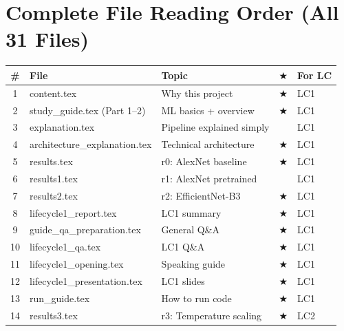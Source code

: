 \documentclass[12pt,a4paper]{article}
\begin{document}
\vspace{0.5cm}
\noindent{}

\section*{Complete File Reading Order (All 31 Files)}

\begin{center}
\renewcommand{\arraystretch}{1.15}
\footnotesize
\begin{tabular}{cllcl}
    \toprule
    \textbf{\#} & \textbf{File} & \textbf{Topic} & $\bigstar$ & \textbf{For LC} \\
    \midrule
    1 & content.tex & Why this project & $\bigstar$ & LC1 \\
    2 & study\_guide.tex (Part 1--2) & ML basics + overview & $\bigstar$ & LC1 \\
    3 & explanation.tex & Pipeline explained simply & & LC1 \\
    4 & architecture\_explanation.tex & Technical architecture & $\bigstar$ & LC1 \\
    5 & results.tex & r0: AlexNet baseline & $\bigstar$ & LC1 \\
    6 & results1.tex & r1: AlexNet pretrained & & LC1 \\
    7 & results2.tex & r2: EfficientNet-B3 & $\bigstar$ & LC1 \\
    8 & lifecycle1\_report.tex & LC1 summary & $\bigstar$ & LC1 \\
    9 & guide\_qa\_preparation.tex & General Q\&A & $\bigstar$ & LC1 \\
    10 & lifecycle1\_qa.tex & LC1 Q\&A & $\bigstar$ & LC1 \\
    11 & lifecycle1\_opening.tex & Speaking guide & $\bigstar$ & LC1 \\
    12 & lifecycle1\_presentation.tex & LC1 slides & $\bigstar$ & LC1 \\
    13 & run\_guide.tex & How to run code & $\bigstar$ & LC1 \\
    \midrule
    14 & results3.tex & r3: Temperature scaling & $\bigstar$ & LC2 \\

\end{tabular}
\end{center}
\end{document}
